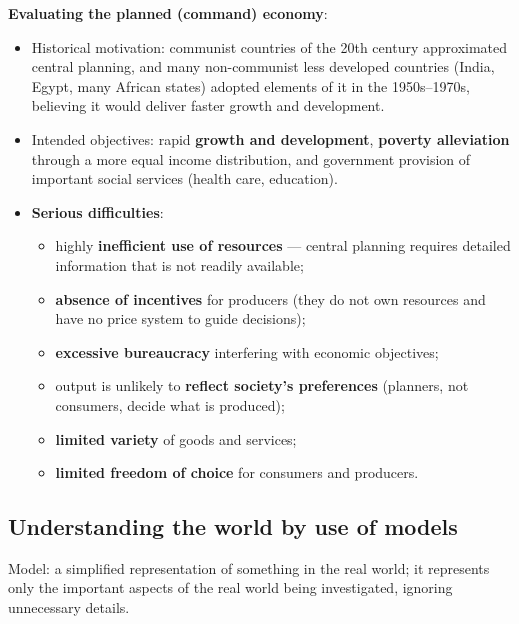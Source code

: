 \documentclass[a4paper,12pt]{article}
\begin{document}
\textbf{Evaluating the planned (command) economy}:
\begin{itemize}
  \item Historical motivation: communist countries of the 20th century approximated central planning, and many non-communist less developed countries (India, Egypt, many African states) adopted elements of it in the 1950s--1970s, believing it would deliver faster growth and development.
  \item Intended objectives: rapid \textbf{growth and development}, \textbf{poverty alleviation} through a more equal income distribution, and government provision of important social services (health care, education).
  \item \textbf{Serious difficulties}:
  \begin{itemize}
    \item highly \textbf{inefficient use of resources} --- central planning requires detailed information that is not readily available;
    \item \textbf{absence of incentives} for producers (they do not own resources and have no price system to guide decisions);
    \item \textbf{excessive bureaucracy} interfering with economic objectives;
    \item output is unlikely to \textbf{reflect society's preferences} (planners, not consumers, decide what is produced);
    \item \textbf{limited variety} of goods and services;
    \item \textbf{limited freedom of choice} for consumers and producers.
  \end{itemize}
\end{itemize}
\subsection{Understanding the world by use of models}
Model: a simplified representation of something in the real world; it represents only the important aspects of the real world being investigated, ignoring unnecessary details.
\end{document}
